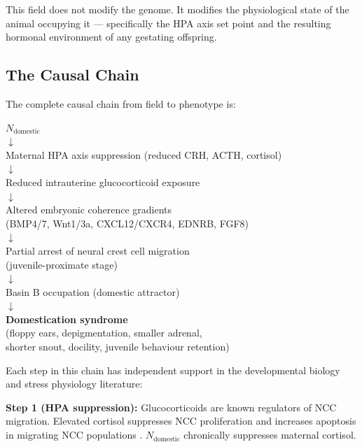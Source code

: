 \documentclass[11pt, a4paper]{article}
\begin{document}
This field does not modify the genome. It modifies the
physiological state of the animal occupying it ---
specifically the HPA axis set point and the resulting
hormonal environment of any gestating offspring.

\subsection{The Causal Chain}

The complete causal chain from field to phenotype is:

\begin{mdframed}[
  backgroundcolor=mechanismbox,
  linecolor=headergreen,
  linewidth=0.8pt,
  innertopmargin=0.5em,
  innerbottommargin=0.5em,
  innerleftmargin=0.8em,
  innerrightmargin=0.8em
]
\begin{center}
\small
$N_{\text{domestic}}$\\[0.2em]
$\downarrow$\\[0.2em]
Maternal HPA axis suppression
(reduced CRH, ACTH, cortisol)\\[0.2em]
$\downarrow$\\[0.2em]
Reduced intrauterine glucocorticoid exposure\\[0.2em]
$\downarrow$\\[0.2em]
Altered embryonic coherence gradients\\
(BMP4/7, Wnt1/3a, CXCL12/CXCR4, EDNRB, FGF8)\\[0.2em]
$\downarrow$\\[0.2em]
Partial arrest of neural crest cell migration\\
(juvenile-proximate stage)\\[0.2em]
$\downarrow$\\[0.2em]
Basin B occupation (domestic attractor)\\[0.2em]
$\downarrow$\\[0.2em]
\textbf{Domestication syndrome}\\
(floppy ears, depigmentation, smaller adrenal,\\
shorter snout, docility, juvenile behaviour retention)
\end{center}
\end{mdframed}

\vspace{0.3em}

Each step in this chain has independent support in
the developmental biology and stress physiology
literature:

\textbf{Step 1 (HPA suppression):} Glucocorticoids are
known regulators of NCC migration. Elevated cortisol
suppresses NCC proliferation and increases apoptosis
in migrating NCC populations \cite{sapolsky2002}.
$N_{\text{domestic}}$ chronically suppresses maternal
cortisol.
\end{document}
